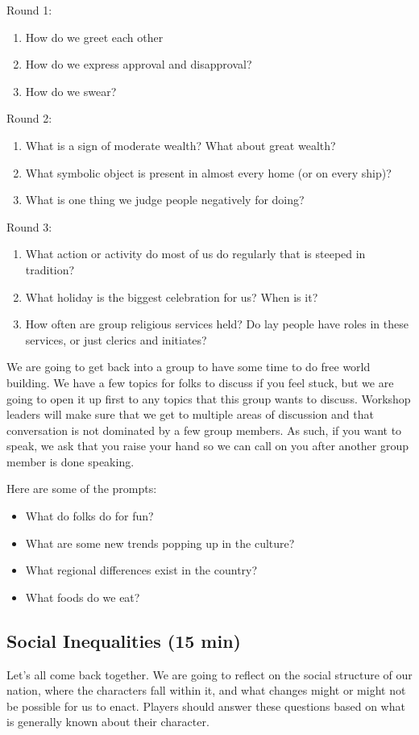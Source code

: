 \documentclass[green]{GL2020}
\begin{document}
Round 1:
\begin{enumerate}
	\item How do we greet each other
	\item How do we express approval and disapproval?
	\item How do we swear?
\end{enumerate}

Round 2:
\begin{enumerate}
	\item What is a sign of moderate wealth? What about great wealth?
	\item What symbolic object is present in almost every home (or on every ship)?
	\item What is one thing we judge people negatively for doing?
\end{enumerate}

Round 3:
\begin{enumerate}
	\item What action or activity do most of us do regularly that is steeped in tradition?
	\item What holiday is the biggest celebration for us? When is it?
	\item How often are group religious services held? Do lay people have roles in these services, or just clerics and initiates?
\end{enumerate}


We are going to get back into a group to have some time to do free world building.  We have a few topics for folks to discuss if you feel stuck, but we are going to open it up first to any topics that this group wants to discuss.  Workshop leaders will make sure that we get to multiple areas of discussion and that conversation is not dominated by a few group members.  As such, if you want to speak, we ask that you raise your hand so we can call on you after another group member is done speaking.

Here are some of the prompts:
\begin{itemize}
	\item What do folks do for fun?
	\item What are some new trends popping up in the culture?
	\item What regional differences exist in the country?
	\item What foods do we eat?
\end{itemize}  

\subsection*{Social Inequalities (15 min)}
Let’s all come back together. We are going to reflect on the social structure of our nation, where the characters fall within it, and what changes might or might not be possible for us to enact. Players should answer these questions based on what is generally known about their character.
\end{document}
